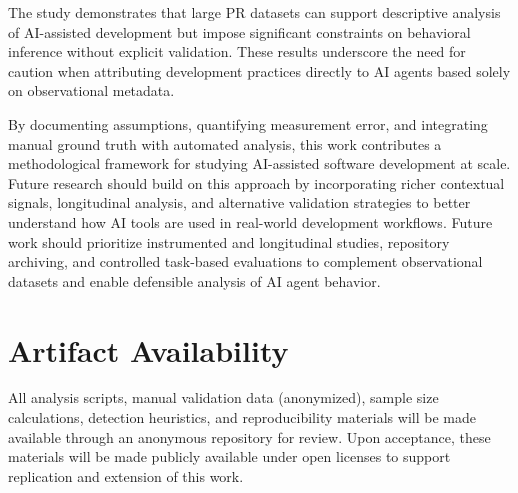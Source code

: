 \documentclass[conference]{IEEEtran}
\begin{document}
The study demonstrates that large PR datasets can support descriptive analysis of AI-assisted development but impose significant constraints on behavioral inference without explicit validation. These results underscore the need for caution when attributing development practices directly to AI agents based solely on observational metadata.

By documenting assumptions, quantifying measurement error, and integrating manual ground truth with automated analysis, this work contributes a methodological framework for studying AI-assisted software development at scale. Future research should build on this approach by incorporating richer contextual signals, longitudinal analysis, and alternative validation strategies to better understand how AI tools are used in real-world development workflows. Future work should prioritize instrumented and longitudinal studies, repository archiving, and controlled task-based evaluations to complement observational datasets and enable defensible analysis of AI agent behavior.

\section*{Artifact Availability}

All analysis scripts, manual validation data (anonymized), sample size calculations, detection heuristics, and reproducibility materials will be made available through an anonymous repository for review. Upon acceptance, these materials will be made publicly available under open licenses to support replication and extension of this work.
\end{document}
